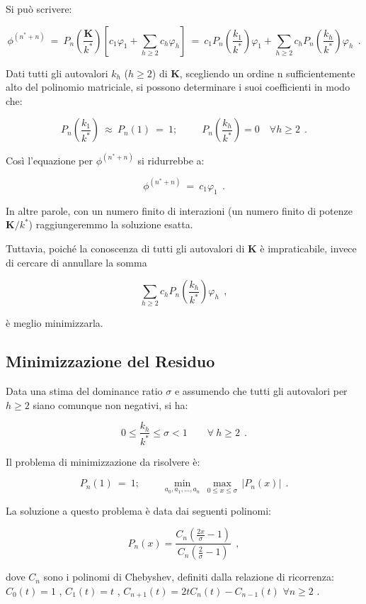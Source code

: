 Si può scrivere:

\[\phi^{(n^* + n)}\ =\ P_n \left(\frac{\mathbf{K}}{k^*}\right) \left[ c_1 \varphi_1 + \sum_{h \geq 2} c_h \varphi_h \right]\ =\ c_1 P_n \left(\frac{k_1}{k^*}\right) \varphi_1 + \sum_{h \geq 2} c_h P_n \left(\frac{k_h}{k^*}\right) \varphi_h\ \ .\]


Dati tutti gli autovalori $k_h$ ($h \geq 2$) di $\mathbf{K}$, scegliendo un ordine n sufficientemente alto del polinomio matriciale, si possono determinare i suoi coefficienti in modo che:

\[P_n \left(\frac{k_1}{k^*}\right)\ \approx\ P_n(1)\ =\ 1;\ \qquad	
\ P_n \left(\frac{k_h}{k^*}\right) = 0 \quad \forall h \geq 2\ \ .\]

Così l'equazione per $\phi^{(n^* + n)}$ si ridurrebbe a:

\[\phi^{(n^* + n)}\ =\ c_1 \varphi_1\ \ .\]

In altre parole, con un numero finito di interazioni (un numero finito di potenze $\mathbf K / k^*$) raggiungeremmo la soluzione esatta.

Tuttavia, poiché la conoscenza di tutti gli autovalori di $\mathbf{K}$ è impraticabile, invece di cercare di annullare la somma

\[\sum_{h \geq 2} c_h P_n \left(\frac{k_h}{k^*}\right) \varphi_h\ \ ,\]

è meglio minimizzarla.

%
%
\subsection{Minimizzazione del Residuo}

Data una stima del dominance ratio $\sigma$ e assumendo che tutti gli autovalori per $h \geq 2$ siano comunque non negativi, si ha:

\[0 \leq \frac{k_h}{k^*} \leq \sigma < 1 \qquad \forall\ h \geq 2\ \ .\]

Il problema di minimizzazione da risolvere è:

\[P_n(1)\ =\ 1;\ \qquad \min_{a_0, a_1, \dots, a_n}\, \max_{0 \leq x \leq \sigma}\, |P_n(x)|\ \ .\]

La soluzione a questo problema è data dai seguenti polinomi:

\[P_n(x) = \frac{C_n\left(\frac{2x}{\sigma} - 1\right)}{C_n\left(\frac{2}{\sigma} - 1\right)}\ \ ,\]

dove $C_n$ sono i polinomi di Chebyshev, definiti dalla relazione di ricorrenza:
$C_0(t) = 1$ , 
$C_1(t) = t$ , 
$C_{n+1}(t) = 2tC_n(t) - C_{n-1}(t)$  $\forall n \geq 2$ .

